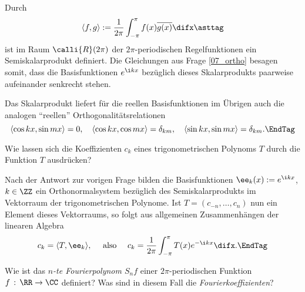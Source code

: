   \begin{antwort}
    Durch 
    \begin{equation} 
      \langle f, g \rangle := \frac{1}{2\pi} \int_{-\pi}^{\pi} 
      f(x) \overline{g(x)} \difx
      \asttag
    \end{equation}
    ist im Raum $\calli{R}(2\pi)$ der $2\pi$-periodischen Regelfunktionen ein 
    Semiskalarprodukt definiert. Die Gleichungen aus Frage \ref{07_ortho} 
    besagen somit, dass die Basisfunktionen $e^{\i kx}$ bezüglich 
    dieses Skalarprodukts paarweise aufeinander senkrecht stehen. 

    Das Skalarprodukt liefert für die reellen Basisfunktionen im Übrigen 
    auch die analogen "`reellen"' Orthogonalitätsrelationen 
    \begin{equation}
      \langle \cos kx, \sin  mx \rangle =0, \quad 
      \langle \cos kx, \cos  mx \rangle =\delta_{km}, \quad
      \langle \sin kx, \sin mx \rangle = \delta_{km}.
      \EndTag
    \end{equation}
  \end{antwort}

  \begin{frage}
    Wie lassen sich die Koeffizienten $c_k$ eines  
    trigonometrischen Polynoms $T$ durch die Funktion $T$ ausdrücken?
  \end{frage}

  \begin{antwort}
    Nach der Antwort zur vorigen Frage bilden die Basisfunktionen 
    $\ee_k (x):=e^{\i kx}$, $k\in\ZZ$ 
    ein Orthonormalsystem bezüglich des Semiskalarprodukts {\astref} 
    im Vektorraum der trigonometrischen Polynome. 
    Ist $T=(c_{-n},\ldots, c_n)$ nun ein Element dieses Vektorraums, 
    so folgt aus allgemeinen Zusammenhängen der 
    linearen Algebra 
    \begin{equation}
      c_k=\langle T, \ee_k \rangle, \quad\text{ also }\quad
      c_k=\frac{1}{2\pi} \int_{-\pi}^\pi T(x) e^{-\i kx} \difx.
      \EndTag
    \end{equation}
  \end{antwort}

  \begin{frage}\label{fkoeffi}
    Wie ist das \emph{$n$-te Fourierpolynom $S_n f$}  
    einer $2\pi$-periodischen Funktion $f\,:\, \RR\to \CC$ definiert? 
    Was sind in diesem Fall die \emph{Fourierkoeffizienten}?
  \end{frage}

